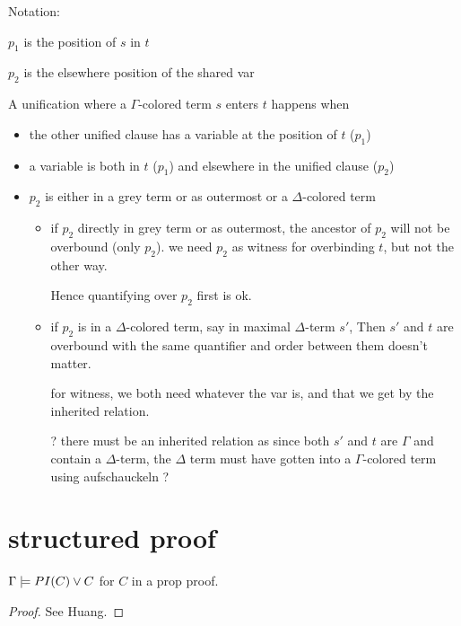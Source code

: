 \documentclass[,%
	paper=a4,%
	DIV20, 
	liststotoc,
	bibtotoc,
	draft=false,%
	numbers=noendperiod
]{scrartcl}
\begin{document}
\vspace{4em}

Notation:

$p_1$ is the position of $s$ in $t$

$p_2$ is the elsewhere position of the shared var 


A unification where a $\Gamma$-colored term $s$ enters $t$ happens when 

\begin{itemize}
	\item the other unified clause has a variable at the position of $t$ ($p_1$)
	\item a variable is both in $t$ ($p_1$) and elsewhere in the unified clause ($p_2$)
	\item $p_2$ is either in a grey term or as outermost or a $\Delta$-colored term
		\begin{itemize}
			\item if $p_2$ directly in grey term or as outermost, the ancestor of $p_2$ will not be overbound (only $p_2$).
				we need $p_2$ as witness for overbinding $t$, but not the other way.

				Hence quantifying over $p_2$ first is ok.

			\item
				if $p_2$ is in a $\Delta$-colored term, say in maximal $\Delta$-term $s'$,
				Then $s'$ and $t$ are overbound with the same quantifier and order between them doesn't matter.

				for witness, we both need whatever the var is, and that we get by the inherited relation.

				? there must be an inherited relation as since both $s'$ and $t$ are $\Gamma$ and contain a $\Delta$-term, the $\Delta$ term must have gotten into a $\Gamma$-colored term using aufschauckeln ?
		\end{itemize}
\end{itemize}



\section{structured proof}

\begin{lemma}
	$\Gamma \models PI(C) \lor C$ for $C$ in a prop proof.
	\label{structured1}
\end{lemma}
\begin{proof}
	See Huang.
\end{proof}
\end{document}
